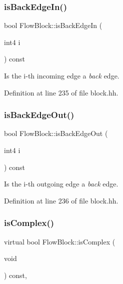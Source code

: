 \subsubsection{\texorpdfstring{isBackEdgeIn()}{isBackEdgeIn()}}
{\footnotesize\ttfamily bool Flow\+Block\+::is\+Back\+Edge\+In (\begin{DoxyParamCaption}\item[{int4}]{i }\end{DoxyParamCaption}) const\hspace{0.3cm}{\ttfamily [inline]}}



Is the i-\/th incoming edge a {\itshape back} edge. 



Definition at line 235 of file block.\+hh.

\mbox{\label{class_flow_block_a771408d6970a7e1d879b122fe6feb7d5}} 
\subsubsection{\texorpdfstring{isBackEdgeOut()}{isBackEdgeOut()}}
{\footnotesize\ttfamily bool Flow\+Block\+::is\+Back\+Edge\+Out (\begin{DoxyParamCaption}\item[{int4}]{i }\end{DoxyParamCaption}) const\hspace{0.3cm}{\ttfamily [inline]}}



Is the i-\/th outgoing edge a {\itshape back} edge. 



Definition at line 236 of file block.\+hh.

\mbox{\label{class_flow_block_ad77905104bb4077b2d213c27b0582bf7}} 
\subsubsection{\texorpdfstring{isComplex()}{isComplex()}}
{\footnotesize\ttfamily virtual bool Flow\+Block\+::is\+Complex (\begin{DoxyParamCaption}\item[{void}]{ }\end{DoxyParamCaption}) const\hspace{0.3cm}{\ttfamily [inline]}, {\ttfamily [virtual]}}



